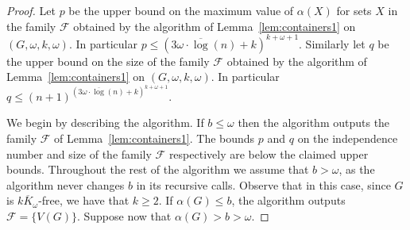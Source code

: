 \documentclass[11pt]{amsart}
\newcommand{\cal}{\mathcal}
\begin{document}
\begin{proof}
%
Let $p$ be the upper bound on the maximum value of $\alpha(X)$ for sets $X$ in the family ${\cal F}$ obtained by the algorithm of Lemma~\ref{lem:containers1} on $(G, \omega, k, \omega)$. In particular $p \leq (3 \omega \cdot \overline{\log}(n) + k)^{k+\omega+1}$.
%
Similarly let $q$ be the upper bound on the size of the family ${\cal F}$ obtained by the algorithm of Lemma~\ref{lem:containers1} on $(G, \omega, k, \omega)$. In particular $q \leq (n+1)^{  {(3\omega \cdot \overline{\log} (n) + k)^{k+\omega+1} }}$.
%

We begin by describing the algorithm. If $b \leq \omega$ then the algorithm outputs the family ${\cal F}$ of Lemma~\ref{lem:containers1}. 
The bounds $p$ and $q$ on the independence number and size of the family ${\cal F}$ respectively are below the claimed upper bounds. 
Throughout the rest of the algorithm we assume that $b > \omega$, as the algorithm never changes $b$ in its recursive calls. Observe that in this case, since $G$ is $\overline{kK_\omega}$-free, we have that $k \geq 2$.
%
If $\alpha(G) \leq b$, the algorithm outputs ${\cal F} = \{V(G)\}$. Suppose now that $\alpha(G) > b > \omega$. 


\end{proof}
\end{document}
